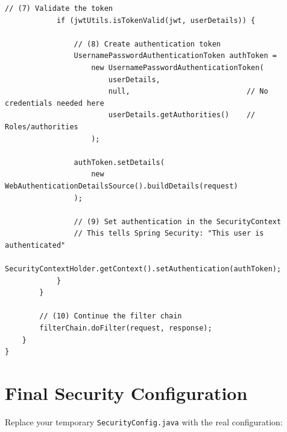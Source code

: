 \documentclass[12pt,a4paper]{report}
\newcommand{\file}[1]{\texttt{\textcolor{successgreen}{#1}}}
\begin{document}
\begin{lstlisting}[caption=JwtAuthFilter.java -- The JWT Filter]
            // (7) Validate the token
            if (jwtUtils.isTokenValid(jwt, userDetails)) {

                // (8) Create authentication token
                UsernamePasswordAuthenticationToken authToken =
                    new UsernamePasswordAuthenticationToken(
                        userDetails,
                        null,                           // No credentials needed here
                        userDetails.getAuthorities()    // Roles/authorities
                    );

                authToken.setDetails(
                    new WebAuthenticationDetailsSource().buildDetails(request)
                );

                // (9) Set authentication in the SecurityContext
                // This tells Spring Security: "This user is authenticated"
                SecurityContextHolder.getContext().setAuthentication(authToken);
            }
        }

        // (10) Continue the filter chain
        filterChain.doFilter(request, response);
    }
}
\end{lstlisting}

\section{Final Security Configuration}

Replace your temporary \file{SecurityConfig.java} with the real configuration:
\end{document}
